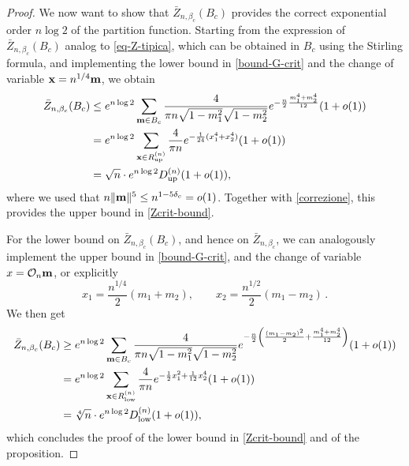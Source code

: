 \documentclass[10pt,a4paper]{amsart}
\def \bm {{\bf m}}
\begin{document}
\begin{proof}
We now want to show that  $\bar{Z}_{n,\beta_c}(B_c)$ provides 
the correct exponential order $n\log 2$ of the partition function. Starting from the expression of $\bar{Z}_{n,\beta_c}(B_c)$ 
analog to \eqref{eq-Z-tipica}, which can be obtained in $B_c$
using the Stirling formula, and implementing the lower bound in \eqref{bound-G-crit}
and the change of variable ${\bf{x}}=n^{1/4}{\bf{m}}$, we obtain
\begin{equation*}
\begin{split}
    \bar{Z}_{n,\beta_c}(B_c)
    &\le e^{n\log 2} \sum_{\bm \in B_c} \frac{4}{\pi n \sqrt{1-m_1^2} \sqrt{1-m_2^2}}
    e^{-\frac{n}{2}\frac{m_1^4+m_2^4}{12}} (1+o(1))\\
    &=e^{n\log 2}\sum_{{\bf x} \in R_{\text{up}}^{(n)}} \frac{4}{\pi n} e^{-\frac{1}{24}(x_1^4+x_2^4)} (1+o(1)) \\
    &=\sqrt{n}\cdot e^{n\log 2} D_{\text{up}}^{(n)} (1+o(1)),
\end{split}
\end{equation*}
where we used that $n\|\bm\|^5\le n^{1-5\delta_c}=o(1)$. 
Together with \eqref{correzione}, this provides the upper bound in \eqref{Zcrit-bound}.

For the lower bound on  $\bar{Z}_{n,\beta_c}(B_c)$, and hence on $\bar{Z}_{n,\beta_c}$,
 we can analogously implement the upper bound in \eqref{bound-G-crit},  
 and the change of variable $\textbf{x}= \mathcal{O}_n\bm$, or explicitly
$$x_1= \frac{n^{1/4}}{2} (m_1+m_2),\qquad x_2= \frac{n^{1/2}}{2} (m_1-m_2)\,.$$
We then get
\begin{equation*}
\begin{split}
    \bar{Z}_{n,\beta_c}(B_c)
    &\ge e^{n\log 2} \sum_{\bm \in B_c} \frac{4}{\pi n \sqrt{1-m_1^2} \sqrt{1-m_2^2}}e^{-\frac{n}{2}\left(\frac{(m_1-m_2)^2}{2} + \frac{m_1^4+m_2^4}{12}\right)} (1+o(1))\\
    &=e^{n\log 2}\sum_{{\bf x} \in R_{\text{low}}^{(n)}} 
    \frac{4}{\pi n} e^{-\frac{1}{2}x_1^2+ \frac{1}{12}x_2^4} (1+o(1)) \\
    &=\sqrt[4]{n}\cdot e^{n\log 2} D_{\text{low}}^{(n)} (1+o(1)),
\end{split}
\end{equation*}
which concludes the proof of the lower bound in \eqref{Zcrit-bound} and 
of the proposition.
\end{proof}
\end{document}
